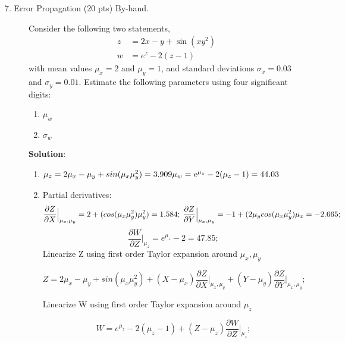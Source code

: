 \documentclass[12pt]{article}
\begin{document}
\begin{description}
\item[7. Error Propagation (20 pts) By-hand.] Consider the following two statements,
\begin{align*}
    z &= 2 x - y + \sin(x y^2) \\
    w &= e^z - 2 (z - 1)
\end{align*}
with mean values $\mu_x = 2$ and $\mu_y = 1$, and standard deviations $\sigma_x = 0.03$ and $\sigma_y = 0.01$. Estimate the following parameters using four significant digits: 
	\begin{enumerate}[label=\textbf{(\alph*)}]
	\item $\mu_w$
	\item $\sigma_w$
	\end{enumerate}

    \color{red}
    \ifsolution
    {\bf Solution}:\\
    \begin{enumerate}[label=\textbf{(\alph*)}]
    
    \item $\mu_z=2\mu_x-\mu_y+sin(\mu_x\mu_y^2)=3.909\\
    \mu_w=e^{\mu_z} - 2(\mu_z - 1)=44.03$
    
    \item Partial derivatives:
    \begin{equation*}
       \frac{\partial Z}{\partial X}\Bigr\rvert_{\mu_x,\mu_y}=2+(cos(\mu_x\mu_y^2)\mu_y^2)=1.584;\:
       \frac{\partial Z}{\partial Y}\Bigr\rvert_{\mu_x,\mu_y}=-1+(2\mu_y cos(\mu_x \mu_y^2) \mu_x=-2.665;\\
    \end{equation*}
    \begin{equation*}
       \frac{\partial W}{\partial Z}\Bigr\rvert_{\mu_z}=e^{\mu_z}-2=47.85;
    \end{equation*}
    Linearize Z using first order Taylor expansion around $\mu_x, \mu_y$
    
        \begin{equation*}
       Z=2\mu_x-\mu_y+sin(\mu_x\mu_y^2)+(X-\mu_x)\frac{\partial Z}{\partial X}\Bigr\rvert_{\mu_x,\mu_y}+(Y-\mu_y)\frac{\partial Z}{\partial Y}\Bigr\rvert_{\mu_x,\mu_y};
    \end{equation*}
    
    Linearize W using first order Taylor expansion around $\mu_z$
    
        \begin{equation*}
       W=e^{\mu_z} - 2(\mu_z - 1)+(Z-\mu_z)\frac{\partial W}{\partial Z}\Bigr\rvert_{\mu_z};
    \end{equation*}
    

\end{enumerate}
\end{description}
\end{document}
